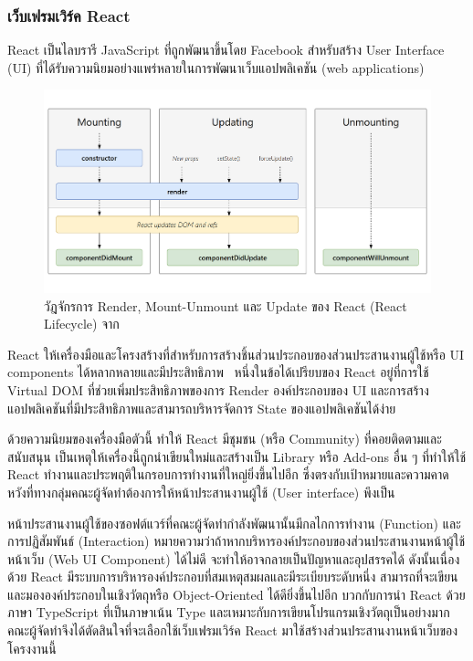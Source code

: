 \documentclass[12pt,one side,openright,a4paper]{cpe-thesis-th}
\newcommand{\thaijustify}[1]{%
  \par\hspace{30pt}\justifying
  #1
}
\begin{document}
        \subsubsection{เว็บเฟรมเวิร์ค React}
            \thaijustify{
                React เป็นไลบรารี JavaScript ที่ถูกพัฒนาขึ้นโดย Facebook สำหรับสร้าง User Interface (UI) ที่ได้รับความนิยมอย่างแพร่หลายในการพัฒนาเว็บแอปพลิเคชัน (web applications)~\cite{flanagan20js}
            }
            \begin{figure}[H]
                \centering
                \includegraphics[width=12cm]{figure/literature/react-lifecycle.png}
                \caption[วัฏจักรการทำงานของ React]{วัฎจักรการ Render, Mount-Unmount และ Update ของ React (React Lifecycle) จาก~\cite{reactcycles}}\label{fig:lit-react}
            \end{figure}
            \thaijustify{
                React ให้เครื่องมือและโครงสร้างที่สำหรับการสร้างชิ้นส่วนประกอบของส่วนประสานงานผู้ใช้หรือ UI components ได้หลากหลายและมีประสิทธิภาพ~\cite{crockford08js} หนึ่งในข้อได้เปรียบของ React อยู่ที่การใช้ Virtual DOM ที่ช่วยเพิ่มประสิทธิภาพของการ Render องค์ประกอบของ UI และการสร้างแอปพลิเคชันที่มีประสิทธิภาพและสามารถบริหารจัดการ State ของแอปพลิเคชันได้ง่าย~\cite{flanagan20js}
            }
            \thaijustify{
                ด้วยความนิยมของเครื่องมือตัวนี้ ทำให้ React มีชุมชน (หรือ Community) ที่คอยติดตามและสนับสนุน เป็นเหตุให้เครื่องนี้ถูกนำเขียนใหม่และสร้างเป็น Library หรือ Add-ons อื่น ๆ ที่ทำให้ใช้ React ทำงานและประพฤติในกรอบการทำงานที่ใหญ่ยิ่งขึ้นไปอีก ซึ่งตรงกับเป้าหมายและความคาดหวังที่ทางกลุ่มคณะผู้จัดทำต้องการให้หน้าประสานงานผู้ใช้ (User interface) พึงเป็น
            }
            \thaijustify{
                หน้าประสานงานผู้ใช้ของซอฟต์แวร์ที่คณะผู้จัดทำกำลังพัฒนานั้นมีกลไกการทำงาน (Function) และการปฏิสัมพันธ์ (Interaction) หมายความว่าถ้าหากบริหารองค์ประกอบของส่วนประสานงานหน้าผู้ใช้หน้าเว็บ (Web UI Component) ได้ไม่ดี จะทำให้อาจกลายเป็นปัญหาและอุปสรรคได้ ดังนั้นเนื่องด้วย React มีระบบการบริหารองค์ประกอบที่สมเหตุสมผลและมีระเบียบระดับหนึ่ง สามารถที่จะเขียนและมององค์ประกอบในเชิงวัตถุหรือ Object-Oriented ได้ดียิ่งขึ้นไปอีก บวกกับการนำ React ด้วยภาษา TypeScript ที่เป็นภาษาเน้น Type และเหมาะกับการเขียนโปรแกรมเชิงวัตถุเป็นอย่างมาก คณะผู้จัดทำจึงได้ตัดสินใจที่จะเลือกใช้เว็บเฟรมเวิร์ค React มาใช้สร้างส่วนประสานงานหน้าเว็บของโครงงานนี้
            }
\end{document}
